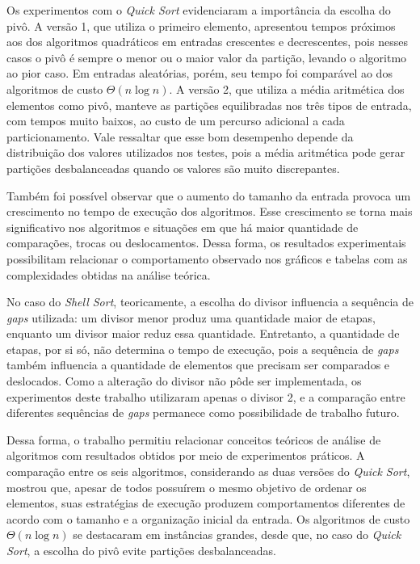 \quad Os experimentos com o \textit{Quick Sort} evidenciaram a importância
da escolha do pivô. A versão 1, que utiliza o primeiro elemento, apresentou
tempos próximos aos dos algoritmos quadráticos em entradas crescentes e
decrescentes, pois nesses casos o pivô é sempre o menor ou o maior valor da
partição, levando o algoritmo ao pior caso. Em entradas aleatórias, porém,
seu tempo foi comparável ao dos algoritmos de custo $\Theta(n\log n)$. A
versão 2, que utiliza a média aritmética dos elementos como pivô, manteve
as partições equilibradas nos três tipos de entrada, com tempos muito
baixos, ao custo de um percurso adicional a cada particionamento. Vale
ressaltar que esse bom desempenho depende da distribuição dos valores
utilizados nos testes, pois a média aritmética pode gerar partições
desbalanceadas quando os valores são muito discrepantes.

\quad Também foi possível observar que o aumento do tamanho da entrada
provoca um crescimento no tempo de execução dos algoritmos. Esse
crescimento se torna mais significativo nos algoritmos e situações em que
há maior quantidade de comparações, trocas ou deslocamentos. Dessa forma,
os resultados experimentais possibilitam relacionar o comportamento
observado nos gráficos e tabelas com as complexidades obtidas na análise
teórica.

\quad No caso do \textit{Shell Sort}, teoricamente, a escolha do divisor
influencia a sequência de \textit{gaps} utilizada: um divisor menor produz
uma quantidade maior de etapas, enquanto um divisor maior reduz essa
quantidade. Entretanto, a quantidade de etapas, por si só, não determina o
tempo de execução, pois a sequência de \textit{gaps} também influencia a
quantidade de elementos que precisam ser comparados e deslocados. Como a
alteração do divisor não pôde ser implementada, os experimentos deste
trabalho utilizaram apenas o divisor 2, e a comparação entre diferentes
sequências de \textit{gaps} permanece como possibilidade de trabalho
futuro.

\quad Dessa forma, o trabalho permitiu relacionar conceitos teóricos de
análise de algoritmos com resultados obtidos por meio de experimentos
práticos. A comparação entre os seis algoritmos, considerando as duas
versões do \textit{Quick Sort}, mostrou que, apesar de todos possuírem o
mesmo objetivo de ordenar os elementos, suas estratégias de execução
produzem comportamentos diferentes de acordo com o tamanho e a organização
inicial da entrada. Os algoritmos de custo $\Theta(n\log n)$ se destacaram
em instâncias grandes, desde que, no caso do \textit{Quick Sort}, a escolha
do pivô evite partições desbalanceadas.